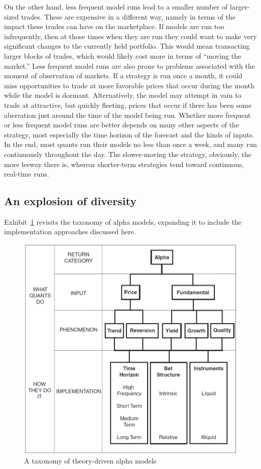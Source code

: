 \documentclass[11pt]{report}
\begin{document}
				On the other hand, less frequent model runs lead to a smaller number of larger-sized trades. These are expensive in a different way, namely in terms of the impact these trades can have on the marketplace. If models are run too infrequently, then at those times when they are run they could want to make very significant changes to the currently held portfolio. This would mean transacting larger blocks of trades, which would likely cost more in terms of ``moving the market.'' Less frequent model runs are also prone to problems associated with the moment of observation of markets. If a strategy is run once a month, it could miss opportunities to trade at more favorable prices that occur during the month while the model is dormant. Alternatively, the model may attempt in vain to trade at attractive, but quickly fleeting, prices that occur if there has been some aberration just around the time of the model being run. Whether more frequent or less frequent model runs are better depends on many other aspects of the strategy, most especially the time horizon of the forecast and the kinds of inputs. In the end, most quants run their models no less than once a week, and many run continuously throughout the day. The slower-moving the strategy, obviously, the more leeway there is, whereas shorter-term strategies tend toward continuous, real-time runs.

			\subsection{An explosion of diversity}

				Exhibit~\ref{fig:taxonomy} revisits the taxonomy of alpha models, expanding it to include the implementation approaches discussed here.
				\begin{figure}[htbp]
					\centering
					\includegraphics[width=.9\textwidth]{taxonomy.png}
					\caption{A taxonomy of theory-driven alpha models}
					\label{fig:taxonomy}
				\end{figure}
\end{document}
